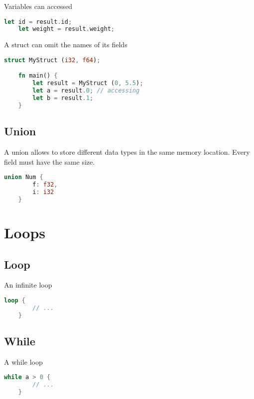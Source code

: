 \documentclass{article}
\begin{document}
Variables can accessed

\begin{lstlisting}[language=Rust, style=boxed, numbers=none]
    let id = result.id;
    let weight = result.weight;
\end{lstlisting}

A struct can omit the names of its fields

\begin{lstlisting}[language=Rust, style=boxed, numbers=none]
    struct MyStruct (i32, f64);

    fn main() {
        let result = MyStruct (0, 5.5);
        let a = result.0; // accessing
        let b = result.1;
    }
\end{lstlisting}

\subsection{Union}

A union allows to store different data types
in the same memory location. Every field must have
the same size.

\begin{lstlisting}[language=Rust, style=boxed, numbers=none]
    union Num {
        f: f32,
        i: i32
    }
\end{lstlisting}

\pagebreak

\section{Loops}

\subsection{Loop}

An infinite loop

\begin{lstlisting}[language=Rust, style=boxed, numbers=none]
    loop {
        // ...
    }
\end{lstlisting}

\subsection{While}

A while loop

\begin{lstlisting}[language=Rust, style=boxed, numbers=none]
    while a > 0 {
        // ...
    }
\end{lstlisting}
\end{document}
